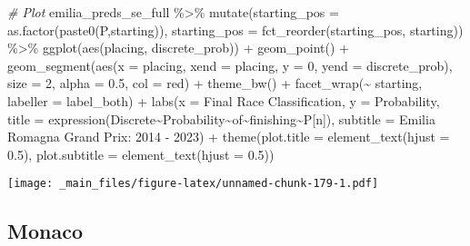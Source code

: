 \documentclass[
]{book}
\newenvironment{Shaded}{\begin{snugshade}}{\end{snugshade}}
\newcommand{\AttributeTok}[1]{\textcolor[rgb]{0.77,0.63,0.00}{#1}}
\newcommand{\CommentTok}[1]{\textcolor[rgb]{0.56,0.35,0.01}{\textit{#1}}}
\newcommand{\DecValTok}[1]{\textcolor[rgb]{0.00,0.00,0.81}{#1}}
\newcommand{\FloatTok}[1]{\textcolor[rgb]{0.00,0.00,0.81}{#1}}
\newcommand{\FunctionTok}[1]{\textcolor[rgb]{0.00,0.00,0.00}{#1}}
\newcommand{\NormalTok}[1]{#1}
\newcommand{\SpecialCharTok}[1]{\textcolor[rgb]{0.00,0.00,0.00}{#1}}
\newcommand{\StringTok}[1]{\textcolor[rgb]{0.31,0.60,0.02}{#1}}
\begin{document}
\begin{Shaded}
\begin{Highlighting}[]
\CommentTok{\# Plot}
\NormalTok{emilia\_preds\_se\_full }\SpecialCharTok{\%\textgreater{}\%}
  \FunctionTok{mutate}\NormalTok{(}\AttributeTok{starting\_pos =} \FunctionTok{as.factor}\NormalTok{(}\FunctionTok{paste0}\NormalTok{(}\StringTok{\textquotesingle{}P\textquotesingle{}}\NormalTok{,starting)),}
         \AttributeTok{starting\_pos =} \FunctionTok{fct\_reorder}\NormalTok{(starting\_pos, starting)) }\SpecialCharTok{\%\textgreater{}\%}
  \FunctionTok{ggplot}\NormalTok{(}\FunctionTok{aes}\NormalTok{(placing, discrete\_prob)) }\SpecialCharTok{+}
  \FunctionTok{geom\_point}\NormalTok{() }\SpecialCharTok{+}
  \FunctionTok{geom\_segment}\NormalTok{(}\FunctionTok{aes}\NormalTok{(}\AttributeTok{x =}\NormalTok{ placing, }\AttributeTok{xend =}\NormalTok{ placing, }\AttributeTok{y =} \DecValTok{0}\NormalTok{, }\AttributeTok{yend =}\NormalTok{ discrete\_prob),}
               \AttributeTok{size =} \DecValTok{2}\NormalTok{, }\AttributeTok{alpha =} \FloatTok{0.5}\NormalTok{, }\AttributeTok{col =} \StringTok{\textquotesingle{}red\textquotesingle{}}\NormalTok{) }\SpecialCharTok{+}
  \FunctionTok{theme\_bw}\NormalTok{() }\SpecialCharTok{+}
  \FunctionTok{facet\_wrap}\NormalTok{(}\SpecialCharTok{\textasciitilde{}}\NormalTok{ starting, }\AttributeTok{labeller =}\NormalTok{ label\_both) }\SpecialCharTok{+}
  \FunctionTok{labs}\NormalTok{(}\AttributeTok{x =} \StringTok{\textquotesingle{}Final Race Classification\textquotesingle{}}\NormalTok{,}
       \AttributeTok{y =} \StringTok{\textquotesingle{}Probability\textquotesingle{}}\NormalTok{,}
       \AttributeTok{title =} \FunctionTok{expression}\NormalTok{(Discrete}\SpecialCharTok{\textasciitilde{}}\NormalTok{Probability}\SpecialCharTok{\textasciitilde{}}\NormalTok{of}\SpecialCharTok{\textasciitilde{}}\NormalTok{finishing}\SpecialCharTok{\textasciitilde{}}\NormalTok{P[n]),}
       \AttributeTok{subtitle =} \StringTok{\textquotesingle{}Emilia Romagna Grand Prix: 2014 {-} 2023\textquotesingle{}}\NormalTok{) }\SpecialCharTok{+}
  \FunctionTok{theme}\NormalTok{(}\AttributeTok{plot.title =} \FunctionTok{element\_text}\NormalTok{(}\AttributeTok{hjust =} \FloatTok{0.5}\NormalTok{),}
        \AttributeTok{plot.subtitle =} \FunctionTok{element\_text}\NormalTok{(}\AttributeTok{hjust =} \FloatTok{0.5}\NormalTok{)) }
\end{Highlighting}
\end{Shaded}

\texttt{[image: \_main\_files/figure-latex/unnamed-chunk-179-1.pdf]}

\hypertarget{monaco-1}{%
\subsection{Monaco}\label{monaco-1}}
\end{document}

